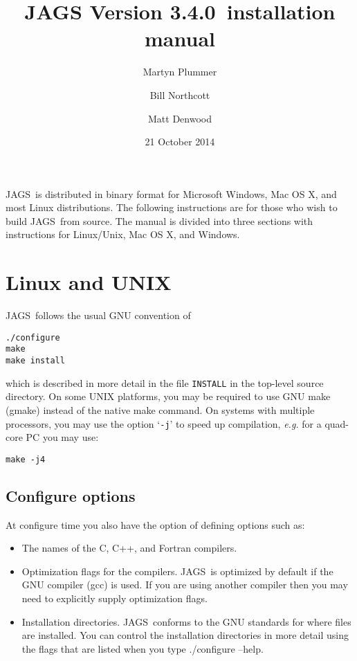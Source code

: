 \documentclass[11pt, a4paper, titlepage]{article}
\newcommand{\release}{3.4.0}
\newcommand{\JAGS}{\textsf{JAGS}}
\newcommand{\code}[1]{{\bgroup{\normalfont\ttfamily #1}\egroup}}
\newcommand{\samp}[1]{{`\bgroup\normalfont\texttt{#1}'\egroup}}
\let\command=\code
\let\option=\samp
\begin{document}
\title{JAGS Version \release\ installation manual}
\author{Martyn Plummer \and Bill Northcott \and Matt Denwood}
\date{21 October 2014}
\maketitle

\JAGS\ is distributed in binary format for Microsoft Windows, Mac OS
X, and most Linux distributions.  The following instructions are for
those who wish to build \JAGS\ from source. The manual is divided
into three sections with instructions for Linux/Unix, Mac OS X, and Windows.

\section{Linux and UNIX}

\JAGS\ follows the usual GNU convention of 
\begin{verbatim}
./configure
make
make install
\end{verbatim}
which is described in more detail in the file \texttt{INSTALL} in
the top-level source directory. On some UNIX platforms, you may
be required to use GNU make (gmake) instead of the native make
command. On systems with multiple processors, you may use the option 
\option{-j} to speed up compilation, {\em e.g.} for a quad-core PC you
may use:
\begin{verbatim}
make -j4
\end{verbatim}

\subsection{Configure options}

At configure time you also have the option of defining options such
as:
\begin{itemize}
\item The names of the C, C++, and Fortran compilers.  
\item Optimization flags for the compilers.  \JAGS\ is optimized by
  default if the GNU compiler (gcc) is used. If you are using another
  compiler then you may need to explicitly supply optimization flags.
\item Installation directories. \JAGS\ conforms to the GNU standards
  for where files are installed. You can control the installation
  directories in more detail using the flags that are listed when
  you type \command{./configure --help}.
\end{itemize}
\end{document}
